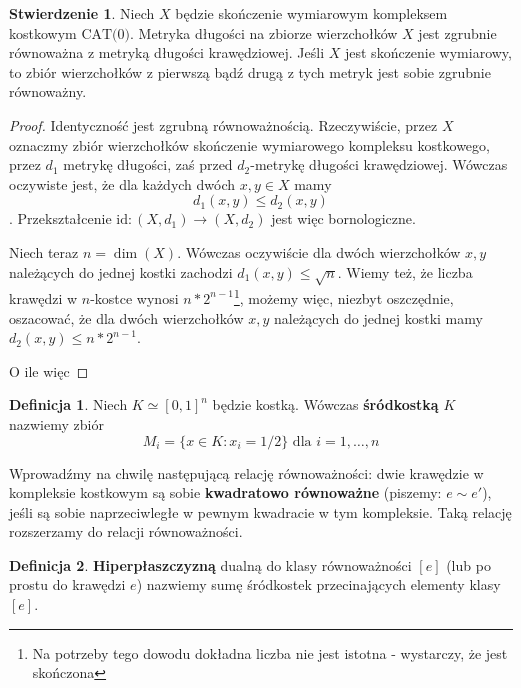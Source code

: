 \documentclass[licencjacka]{pracamgr}
\theoremstyle{definition}
\newtheorem{definition}{Definicja}[section]
\theoremstyle{definition}
\theoremstyle{definition}
\newtheorem{proposition}{Stwierdzenie}[section]
\theoremstyle{definition}
\theoremstyle{definition}
\theoremstyle{plain}
\theoremstyle{plain}
\begin{document}
\begin{proposition}\label{pro:equivalent}
	Niech $ X $ będzie skończenie wymiarowym 
	kompleksem kostkowym $ \text{CAT(0)}$. Metryka długości na 
	zbiorze wierzchołków $ X $ jest zgrubnie równoważna z metryką długości krawędziowej.
	Jeśli $ X $ jest skończenie wymiarowy, to zbiór wierzchołków z pierwszą bądź drugą z 
	tych metryk jest sobie zgrubnie równoważny.
\end{proposition}
\begin{proof}
	Identyczność jest zgrubną równoważnością. Rzeczywiście, przez $ X $ oznaczmy 
	zbiór wierzchołków skończenie wymiarowego kompleksu kostkowego, przez 
	$ d_1 $ metrykę długości, zaś przed $ d_2 $-metrykę długości krawędziowej. 
	Wówczas oczywiste jest, że dla każdych dwóch $ x,y \in X $ mamy
	$$ d_1(x,y) \leq d_2(x,y) $$.	
	Przekształcenie $ \text{id}: (X,d_1) \rightarrow (X,d_2) $ jest więc bornologiczne.

	Niech teraz $ n = \dim(X) $. Wówczas oczywiście dla dwóch wierzchołków $ x,y $ 
	należących do jednej kostki zachodzi $ d_1(x,y) \leq \sqrt{n} $. Wiemy też, że liczba 
	krawędzi w $ n$-kostce wynosi $ n*2^{n-1} $\footnote{Na potrzeby tego dowodu 
	dokładna liczba nie jest istotna - wystarczy, że jest skończona}, możemy więc, 
	niezbyt oszczędnie, oszacować, że dla dwóch wierzchołków $ x,y $ należących do jednej 
	kostki mamy $ d_2(x,y) \leq n*2^{n-1} $. 

	O ile więc 
\end{proof}

\begin{definition}
	Niech $ K \simeq [0,1]^n $ będzie kostką. Wówczas \textbf{śródkostką} $ K $ nazwiemy 
	zbiór
	$$ M_i = \{ x \in K : x_i = 1/2 \} \text{ dla } i = 1,\dots,n $$
\end{definition}
Wprowadźmy na chwilę następującą relację równoważności: dwie krawędzie w kompleksie 
kostkowym są sobie \textbf{kwadratowo równoważne} (piszemy: $ e \sim e' $), jeśli 
są sobie naprzeciwległe w pewnym kwadracie w tym kompleksie. Taką relację rozszerzamy do 
relacji równoważności.
\begin{definition}
	\textbf{Hiperpłaszczyzną} dualną do klasy równoważności $ [e] $ (lub po prostu do 
	krawędzi $ e $) nazwiemy sumę śródkostek przecinających elementy klasy $ [e] $.
\end{definition}
\end{document}
